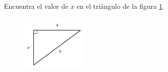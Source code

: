 \question[15]  Encuentra el valor de $x$ en el triángulo de la figura \ref{fig:lados_pitagoras_24}.
\begin{figure}[H]
    \begin{center}
        \includegraphics[width=0.3\textwidth]{../images/lados_pitagoras_24.png}
    \end{center}
    \caption{}
    \label{fig:lados_pitagoras_24}
\end{figure}